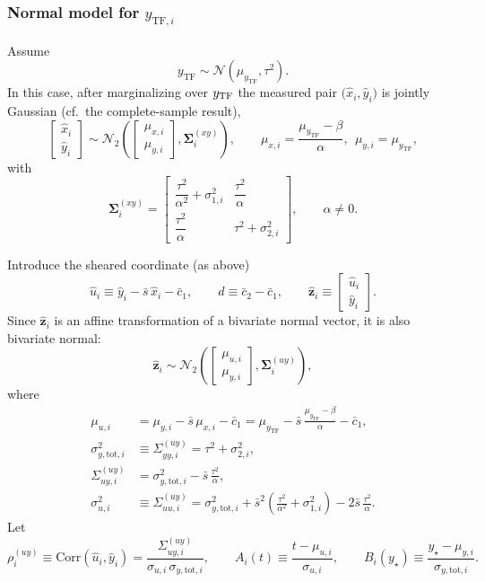 \subsubsection{Normal model for $y_{\mathrm{TF},i}$}
Assume
\[
y_{\mathrm{TF}}\sim \mathcal N(\mu_{y_\mathrm{TF}},\tau^2).
\]
In this case, after marginalizing over $y_{\rm TF}$ the measured pair
$\bigl(\hat x_i,\hat y_i\bigr)$ is jointly Gaussian (cf.\ the complete-sample
result),
\begin{equation}
\begin{bmatrix}\hat x_i\\ \hat y_i\end{bmatrix}
\sim
\mathcal N_2\!\left(
\begin{bmatrix}\mu_{x,i}\\ \mu_{y,i}\end{bmatrix},
\boldsymbol\Sigma^{(xy)}_i
\right),
\qquad
\mu_{x,i}=\frac{\mu_{y_\mathrm{TF}}-\beta}{\alpha},\ \ \mu_{y,i}=\mu_{y_\mathrm{TF}},
\end{equation}
with
\begin{equation}
\boldsymbol\Sigma^{(xy)}_i
=
\begin{bmatrix}
\dfrac{\tau^{2}}{\alpha^{2}}+\sigma_{1,i}^{2} & \dfrac{\tau^{2}}{\alpha}\\[6pt]
\dfrac{\tau^{2}}{\alpha} & \tau^{2}+\sigma_{2,i}^{2}
\end{bmatrix},
\qquad \alpha\neq 0.
\end{equation}

Introduce the sheared coordinate (as above)
\[
\hat u_i \equiv \hat y_i-\bar s\,\hat x_i-\bar c_1,
\qquad
d\equiv \bar c_2-\bar c_1,
\qquad
\hat{\boldsymbol z}_i \equiv
\begin{bmatrix}\hat u_i\\ \hat y_i\end{bmatrix}.
\]
Since $\hat{\boldsymbol z}_i$ is an affine transformation of a bivariate normal
vector, it is also bivariate normal:
\begin{equation}
\hat{\boldsymbol z}_i \sim
\mathcal N_2\!\left(
\begin{bmatrix}\mu_{u,i}\\ \mu_{y,i}\end{bmatrix},
\boldsymbol\Sigma^{(uy)}_i
\right),
\end{equation}
where
\begin{align}
\mu_{u,i}
&=\mu_{y,i}-\bar s\,\mu_{x,i}-\bar c_1
=\mu_{y_\mathrm{TF}}-\bar s\,\frac{\mu_{y_\mathrm{TF}}-\beta}{\alpha}-\bar c_1,\\[3pt]
\sigma_{y,\mathrm{tot},i}^2
&\equiv \Sigma^{(uy)}_{yy,i}
=\tau^2+\sigma_{2,i}^2,\\
\Sigma^{(uy)}_{uy,i}
&=\sigma_{y,\mathrm{tot},i}^2-\bar s\,\frac{\tau^2}{\alpha},\\
\sigma_{u,i}^2
&\equiv \Sigma^{(uy)}_{uu,i}
=\sigma_{y,\mathrm{tot},i}^2
+\bar s^2\!\left(\frac{\tau^2}{\alpha^2}+\sigma_{1,i}^2\right)
-2\bar s\,\frac{\tau^2}{\alpha}.
\end{align}
Let
\[
\rho^{(uy)}_i \equiv \mathrm{Corr}(\hat u_i,\hat y_i)
=\frac{\Sigma^{(uy)}_{uy,i}}{\sigma_{u,i}\,\sigma_{y,\mathrm{tot},i}},
\qquad
A_i(t)\equiv \frac{t-\mu_{u,i}}{\sigma_{u,i}},
\qquad
B_i(y_\star)\equiv \frac{y_\star-\mu_{y,i}}{\sigma_{y,\mathrm{tot},i}}.
\]

